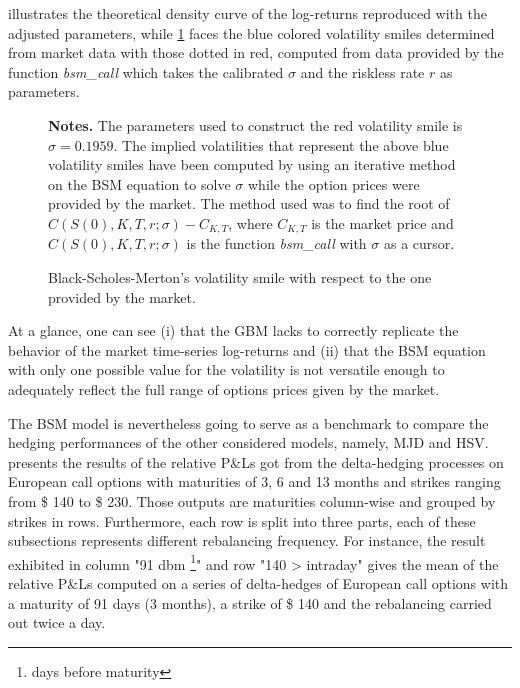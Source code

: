 \documentclass[a4paper, 12pt]{report}
\begin{document}
 illustrates the theoretical density curve of the log-returns reproduced with the adjusted parameters, while \cref{p:analysis:gbm:option:adjusted} faces the blue colored volatility smiles determined from market data with those dotted in red, computed from data provided by the function \textit{bsm\_call} which takes the calibrated $\sigma$ and the riskless rate $r$ as parameters.

\begin{figure}[h]
  \centering
  
  \caption{Black-Scholes-Merton's volatility smile with respect to the one provided by the market.}
  \begin{changemargin}{0.5cm}{0.5cm}
  \medskip
\footnotesize
{}\textbf{Notes.} The parameters used to construct the red volatility smile is $\sigma =  0.1959$.
The implied volatilities that represent the above blue volatility smiles have been computed by using an iterative method on the BSM equation to solve  $\sigma$ while the option prices were provided by the market.
The method used was to find the root of $C(S(0), K, T, r; \sigma) - C_{K, T}$, where $C_{K, T}$ is the market price and $C(S(0), K, T, r; \sigma)$ is the function \textit{bsm\_call} with $\sigma$ as a cursor.
  \end{changemargin}
  \label{p:analysis:gbm:option:adjusted}
\end{figure}

At a glance, one can see (i) that the GBM lacks to correctly replicate the behavior of the market time-series log-returns and (ii) that the BSM equation with only one possible value for the volatility is not versatile enough to adequately reflect the full range of options prices given by the market.























The BSM model is nevertheless going to serve as a benchmark to compare the hedging performances of the other considered models, namely, MJD and HSV.
 presents the results of the relative P\&Ls got from the delta-hedging processes on European call options with maturities of 3, 6 and 13 months and strikes ranging from  \$ 140 to \$ 230.
Those outputs are maturities column-wise and grouped by strikes in rows.
Furthermore, each row is split into three parts, each of these subsections represents different rebalancing frequency.
For instance, the result exhibited in column "91 dbm \footnote{days before maturity}" and row "140 > intraday" gives the mean of the relative P\&Ls computed on a series of delta-hedges of European call options with a maturity of 91 days (3 months), a strike of  \$ 140 and the rebalancing carried out twice a day.
\end{document}
